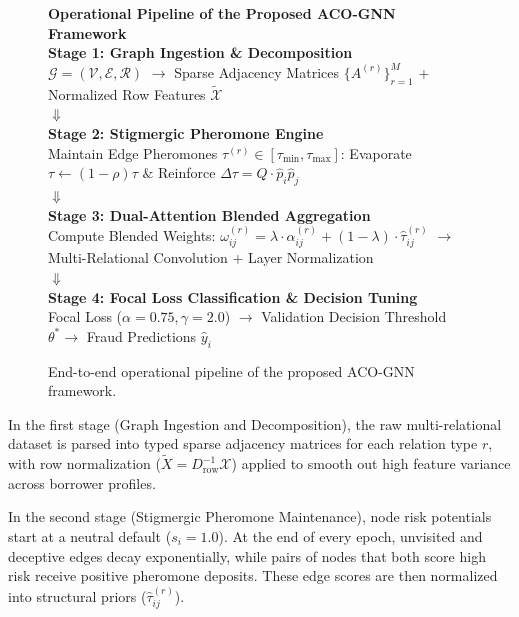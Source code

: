 \begin{figure}[htb]
\centering
\begin{tcolorbox}[sharp corners, boxrule=0.8pt, colback=white, colframe=black, width=\textwidth]
\centering
\textbf{\large Operational Pipeline of the Proposed ACO-GNN Framework}\\[0.3cm]

\textbf{Stage 1: Graph Ingestion \& Decomposition}\\
$\mathcal{G} = (\mathcal{V}, \mathcal{E}, \mathcal{R})$ $\longrightarrow$ Sparse Adjacency Matrices $\{A^{(r)}\}_{r=1}^M$ + Normalized Row Features $\tilde{\mathcal{X}}$\\[0.25cm]
$\boldsymbol{\Downarrow}$\\[0.25cm]

\textbf{Stage 2: Stigmergic Pheromone Engine}\\
Maintain Edge Pheromones $\tau^{(r)} \in [\tau_{\min}, \tau_{\max}]$: Evaporate $\tau \leftarrow (1-\rho)\tau$ \quad $\&$ \quad Reinforce $\Delta\tau = Q \cdot \hat{p}_i \hat{p}_j$\\[0.25cm]
$\boldsymbol{\Downarrow}$\\[0.25cm]

\textbf{Stage 3: Dual-Attention Blended Aggregation}\\
Compute Blended Weights: $\omega_{ij}^{(r)} = \lambda \cdot \alpha_{ij}^{(r)} + (1 - \lambda) \cdot \hat{\tau}_{ij}^{(r)}$ $\longrightarrow$ Multi-Relational Convolution + Layer Normalization\\[0.25cm]
$\boldsymbol{\Downarrow}$\\[0.25cm]

\textbf{Stage 4: Focal Loss Classification \& Decision Tuning}\\
Focal Loss ($\alpha=0.75, \gamma=2.0$) $\longrightarrow$ Validation Decision Threshold $\theta^* \longrightarrow$ Fraud Predictions $\hat{y}_i$
\end{tcolorbox}
\caption{End-to-end operational pipeline of the proposed ACO-GNN framework.}
\label{fig:methodology_flow}
\end{figure}

In the first stage (Graph Ingestion and Decomposition), the raw multi-relational dataset is parsed into typed sparse adjacency matrices for each relation type $r$, with row normalization ($\tilde{X} = D_{\text{row}}^{-1}\mathcal{X}$) applied to smooth out high feature variance across borrower profiles.

In the second stage (Stigmergic Pheromone Maintenance), node risk potentials start at a neutral default ($s_i = 1.0$). At the end of every epoch, unvisited and deceptive edges decay exponentially, while pairs of nodes that both score high risk receive positive pheromone deposits. These edge scores are then normalized into structural priors ($\hat{\tau}_{ij}^{(r)}$).

